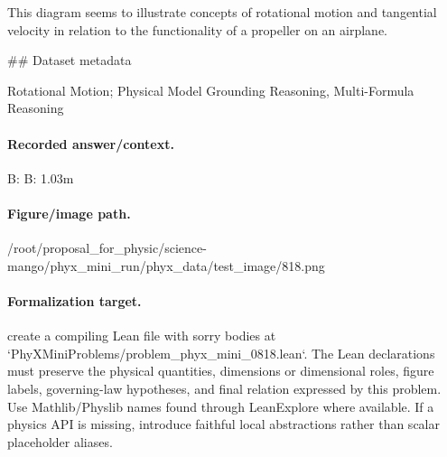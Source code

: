 This diagram seems to illustrate concepts of rotational motion and tangential velocity in relation to the functionality of a propeller on an airplane.

\#\# Dataset metadata

Rotational Motion; Physical Model Grounding Reasoning, Multi-Formula Reasoning

\paragraph{Recorded answer/context.}
B: B: 1.03m

\paragraph{Figure/image path.}
/root/proposal\_for\_physic/science-mango/phyx\_mini\_run/phyx\_data/test\_image/818.png

\paragraph{Formalization target.}
create a compiling Lean file with sorry bodies at `PhyXMiniProblems/problem\_phyx\_mini\_0818.lean`. The Lean declarations must preserve the physical quantities, dimensions or dimensional roles, figure labels, governing-law hypotheses, and final relation expressed by this problem.
Use Mathlib/Physlib names found through LeanExplore where available. If a physics API is missing, introduce faithful local abstractions rather than scalar placeholder aliases.

